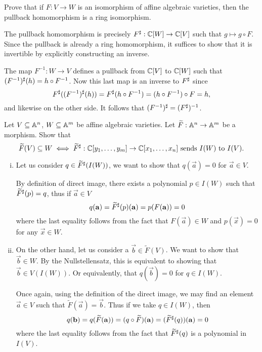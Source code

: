 \documentclass[12pt]{memoir}
\begin{document}
\begin{Ej}
  Prove that if $F : V \to W$ is an isomorphism of affine algebraic varieties, then the pullback homomorphism is a ring isomorphism.
\end{Ej}

\begin{ptcbr}
  The pullback homomorphism is precisely $F^\sharp:\mathbb{C}[W]\to\mathbb{C}[V]$ such that $g\mapsto g\circ F$. Since the pullback is already a ring homomorphism, it suffices to show that it is invertible by explicitly constructing an inverse.\par 
  The map $F^{-1}:W\to V$ defines a pullback from $\mathbb{C}[V]$ to $\mathbb{C}[W]$ such that $(F^{-1})^\sharp(h)=h\circ F^{-1}$. Now this last map is an inverse to $F^{\sharp}$ since 
  $$F^\sharp((F^{-1})^\sharp(h))=F^\sharp(h\circ F^{-1})=(h\circ F^{-1})\circ F=h,$$
  and likewise on the other side. It follows that $(F^{-1})^\sharp=(F^\sharp)^{-1}$.
\end{ptcbr}

\begin{Ej}
  Let $V\subseteq \mathbb{A}^n$, $W\subseteq \mathbb{A}^m$ be affine algebraic varieties. Let $\widetilde{F}:\mathbb{A}^n\to\mathbb{A}^m$ be a morphism. Show that 
  $$\widetilde{F}(V)\subseteq W\iff \widetilde{F}^\sharp:\mathbb{C}[y_1,\dots,y_m]\to\mathbb{C}[x_1,\dots,x_n]\ \text{sends } I(W)\ \text{to } I(V).$$
\end{Ej}

\begin{ptcbr}
  \begin{enumerate}[i)]
    \itemsep=-0.4em
    \item Let us consider $q\in\widetilde{F}^\sharp(I(W))$, we want to show that $q(\vec a)=0$ for $\vec a\in V$.\par 
    By definition of direct image, there exists a polynomial $p\in I(W)$ such that $\widetilde{F}^\sharp(p)=q$, thus if $\vec a\in V$
    $$q(\mathbf{a})=\widetilde{F}^\sharp(p)(\mathbf{a})=p(F(\mathbf{a}))=0$$
    where the last equality follows from the fact that $F(\vec a)\in W$ and $p(\vec x)=0$ for any $\vec x\in W$. 
    \item On the other hand, let us consider a $\vec b\in\widetilde{F}(V)$. We want to show that $\vec b\in W$. By the Nullstellensatz, this is equivalent to showing that $\vec b\in V(I(W))$. Or equivalently, that $q(\vec b)=0$ for $q\in I(W)$.\par 
    Once again, using the definition of the direct image, we may find an element $\vec a\in V$ such that $\widetilde{F}(\vec a)=\vec b$. Thus if we take $q\in I(W)$, then
    $$q(\mathbf{b})=q(\widetilde{F}(\mathbf{a}))=(q\circ\widetilde{F})(\mathbf{a})=(\widetilde{F}^\sharp(q))(\mathbf{a})=0$$
    where the last equality follows from the fact that $\widetilde{F}^\sharp(q)$ is a polynomial in $I(V)$.
  \end{enumerate}
\end{ptcbr}
\end{document}
